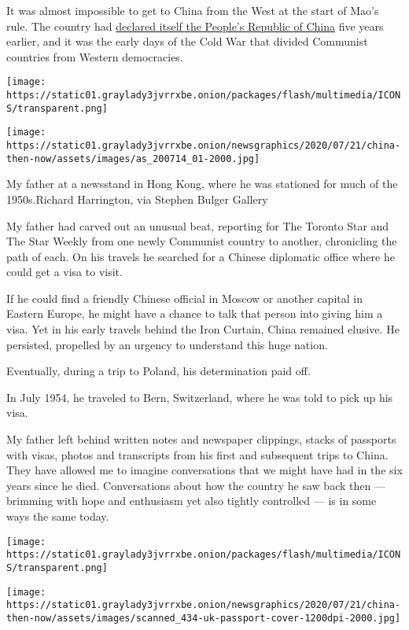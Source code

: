 It was almost impossible to get to China from the West at the start of
Mao's rule. The country had
\href{https://archive.nytimes3xbfgragh.onion/www.nytimes3xbfgragh.onion/library/world/asia/100149mao-communism.html}{declared
itself the People's Republic of China} five years earlier, and it was
the early days of the Cold War that divided Communist countries from
Western democracies.

\texttt{[image: https://static01.graylady3jvrrxbe.onion/packages/flash/multimedia/ICONS/transparent.png]}

\texttt{[image: https://static01.graylady3jvrrxbe.onion/newsgraphics/2020/07/21/china-then-now/assets/images/as\_200714\_01-2000.jpg]}

My father at a newsstand in Hong Kong, where he was stationed for much
of the 1950s.Richard Harrington, via Stephen Bulger Gallery

My father had carved out an unusual beat, reporting for The Toronto Star
and The Star Weekly from one newly Communist country to another,
chronicling the path of each. On his travels he searched for a Chinese
diplomatic office where he could get a visa to visit.

If he could find a friendly Chinese official in Moscow or another
capital in Eastern Europe, he might have a chance to talk that person
into giving him a visa. Yet in his early travels behind the Iron
Curtain, China remained elusive. He persisted, propelled by an urgency
to understand this huge nation.

Eventually, during a trip to Poland, his determination paid off.

In July 1954, he traveled to Bern, Switzerland, where he was told to
pick up his visa.

My father left behind written notes and newspaper clippings, stacks of
passports with visas, photos and transcripts from his first and
subsequent trips to China. They have allowed me to imagine conversations
that we might have had in the six years since he died. Conversations
about how the country he saw back then --- brimming with hope and
enthusiasm yet also tightly controlled --- is in some ways the same
today.

\texttt{[image: https://static01.graylady3jvrrxbe.onion/packages/flash/multimedia/ICONS/transparent.png]}

\texttt{[image: https://static01.graylady3jvrrxbe.onion/newsgraphics/2020/07/21/china-then-now/assets/images/scanned\_434-uk-passport-cover-1200dpi-2000.jpg]}

